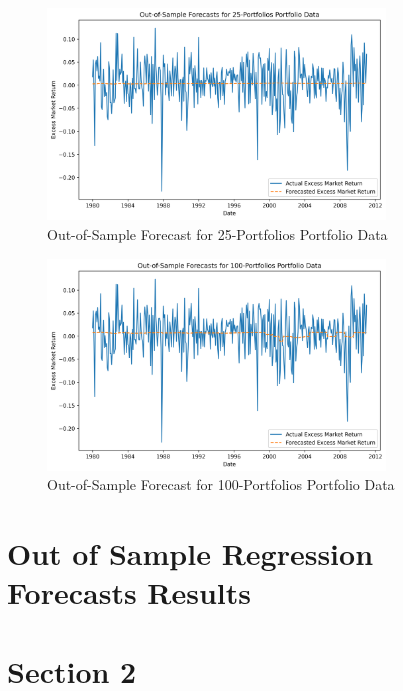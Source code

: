 \documentclass[12pt]{article}
\begin{document}
\begin{figure}[h]
    \centering
    \includegraphics[width=0.8\textwidth]{plots/Out_of_Sample_Forecasts_for_25_Portfolios_Portfolio_Data.png}
    \caption{Out-of-Sample Forecast for 25-Portfolios Portfolio Data}
    \label{fig:forecast_chart}
\end{figure}

\begin{figure}[h]
    \centering
    \includegraphics[width=0.8\textwidth]{plots/Out_of_Sample_Forecasts_for_100_Portfolios_Portfolio_Data.png}
    \caption{Out-of-Sample Forecast for 100-Portfolios Portfolio Data}
    \label{fig:forecast_chart}
\end{figure}


\doublespacing
\section{Out of Sample Regression Forecasts Results}




\doublespacing
\section{Section 2}
\end{document}
